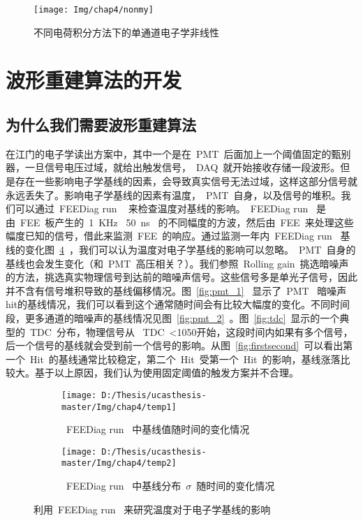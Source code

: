 \begin{figure}[!htbp]
  \centering
   \texttt{[image: Img/chap4/nonmy]}
    \caption{不同电荷积分方法下的单通道电子学非线性}
  \label{fig:mynon}
\end{figure}

\section{波形重建算法的开发}
\subsection{为什么我们需要波形重建算法}
在江门的电子学读出方案中，其中一个是在~PMT~后面加上一个阈值固定的甄别器，一旦信号电压过域，就给出触发信号，~DAQ~就开始接收存储一段波形。但是存在一些影响电子学基线的因素，会导致真实信号无法过域，这样这部分信号就永远丢失了。影响电子学基线的因素有温度，~PMT~自身，以及信号的堆积。我们可以通过~FEEDiag run ~ 来检查温度对基线的影响。~FEEDiag run~ 是由~FEE~板产生的~1~KHz~ 50~ns ~的不同幅度的方波，然后由~FEE~来处理这些幅度已知的信号，借此来监测~FEE~的响应。通过监测一年内~FEEDiag run~ 基线的变化图~\ref{fig:temp}~，我们可以认为温度对电子学基线的影响可以忽略。~PMT~自身的基线也会发生变化（和~PMT~高压相关？）。我们参照~Rolling gain~挑选暗噪声的方法，挑选真实物理信号到达前的暗噪声信号。这些信号多是单光子信号，因此并不含有信号堆积导致的基线偏移情况。图~\ref{fig:pmt_1}~ 显示了~PMT~ 暗噪声hit的基线情况，我们可以看到这个通常随时间会有比较大幅度的变化。不同时间段，更多通道的暗噪声的基线情况见图~\ref{fig:pmt_2}~。图~\ref{fig:tdc}~显示的一个典型的~TDC~分布，物理信号从 ~TDC~<1050开始，这段时间内如果有多个信号，后一个信号的基线就会受到前一个信号的影响。从图~\ref{fig:firstsecond}~可以看出第一个~Hit~的基线通常比较稳定，第二个~Hit~受第一个~Hit~的影响，基线涨落比较大。基于以上原因，我们认为使用固定阈值的触发方案并不合理。
\begin{figure}[!htbp]
  \centering
  \begin{subfigure}[b]{\MySubFactor\textwidth}
    \texttt{[image: D:/Thesis/ucasthesis-master/Img/chap4/temp1]}
    \caption{~FEEDiag run~ 中基线值随时间的变化情况 }
    \label{fig:temp_1}
  \end{subfigure}%
  \quad\quad\quad\quad\quad\quad%
  \begin{subfigure}[b]{\MySubFactor\textwidth}
    \texttt{[image: D:/Thesis/ucasthesis-master/Img/chap4/temp2]}
    \caption{ ~FEEDiag run~ 中基线分布~$\sigma$~随时间的变化情况}
    \label{fig:temp_2}
  \end{subfigure}
    \caption{ 利用~FEEDiag run~ 来研究温度对于电子学基线的影响}
  \label{fig:temp}
\end{figure}



